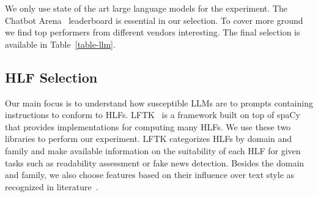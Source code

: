\documentclass[11pt]{article}
\begin{document}
We only use state of the art large language models for the experiment.
The Chatbot Arena~\cite{chiang2024chatbot} leaderboard is essential in our
selection.
To cover more ground we find top performers from different vendors interesting.
The final selection is available in Table~\ref{table-llm}.

\begin{table}[ht]
    \setlength\tabcolsep{6pt}
    \centering
    \caption{Large Language Model Selection}\label{table-llm}
\end{table}

\subsection{HLF Selection}\label{hlf-selection}

Our main focus is to understand how susceptible LLMs are to prompts containing
instructions to conform to HLFs.
LFTK~\cite{lftk-2023} is a framework built on top of spaCy~\cite{spacy}
that provides implementations for computing many HLFs.
We use these two libraries to perform our experiment.
LFTK categorizes HLFs by domain and family and make available information on the
suitability of each HLF for given tasks such as readability assessment or fake
news detection.
Besides the domain and family, we also choose features based on their influence
over text style as recognized in literature~\cite{verma2019lexical,lugea2023stylistics}.
\end{document}
